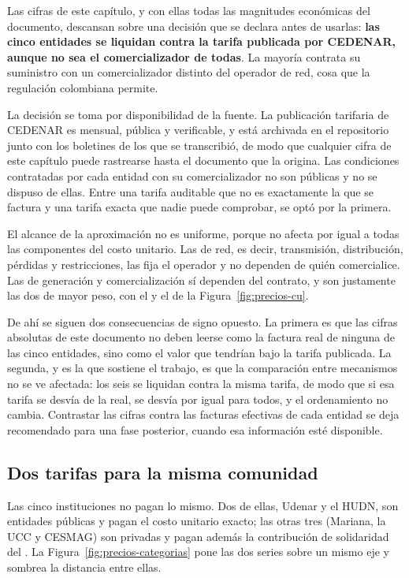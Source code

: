 \begin{trampabox}
Las cifras de este capítulo, y con ellas todas las magnitudes económicas
del documento, descansan sobre una decisión que se declara antes de
usarlas: \textbf{las cinco entidades se liquidan contra la tarifa publicada
por CEDENAR, aunque no sea el comercializador de todas}. La mayoría
contrata su suministro con un comercializador distinto del operador de
red, cosa que la regulación colombiana permite.

La decisión se toma por disponibilidad de la fuente. La publicación
tarifaria de CEDENAR es mensual, pública y verificable, y está archivada
en el repositorio junto con los boletines de los que se transcribió, de
modo que cualquier cifra de este capítulo puede rastrearse hasta el
documento que la origina. Las condiciones contratadas por cada entidad con
su comercializador no son públicas y no se dispuso de ellas. Entre una
tarifa auditable que no es exactamente la que se factura y una tarifa
exacta que nadie puede comprobar, se optó por la primera.

El alcance de la aproximación no es uniforme, porque no afecta por igual a
todas las componentes del costo unitario. Las de red, es decir,
transmisión, distribución, pérdidas y restricciones, las fija el operador
y no dependen de quién comercialice. Las de generación y comercialización
sí dependen del contrato, y son justamente las dos de mayor peso, con el
 y el  de la Figura~\ref{fig:precios-cu}.

De ahí se siguen dos consecuencias de signo opuesto. La primera es que las
cifras absolutas de este documento no deben leerse como la factura real de
ninguna de las cinco entidades, sino como el valor que tendrían bajo la
tarifa publicada. La segunda, y es la que sostiene el trabajo, es que la
comparación entre mecanismos no se ve afectada: los seis se liquidan
contra la misma tarifa, de modo que si esa tarifa se desvía de la real, se
desvía por igual para todos, y el ordenamiento no cambia. Contrastar las
cifras contra las facturas efectivas de cada entidad se deja recomendado
para una fase posterior, cuando esa información esté disponible.
\end{trampabox}

\subsection{Dos tarifas para la misma comunidad}
\label{sub:precios-categorias}

Las cinco instituciones no pagan lo mismo. Dos de ellas, Udenar y el
HUDN, son entidades públicas y pagan el costo unitario exacto; las otras
tres (Mariana, la UCC y CESMAG) son privadas y pagan además la
contribución de solidaridad del . La
Figura~\ref{fig:precios-categorias} pone las dos series sobre un mismo eje
y sombrea la distancia entre ellas.

